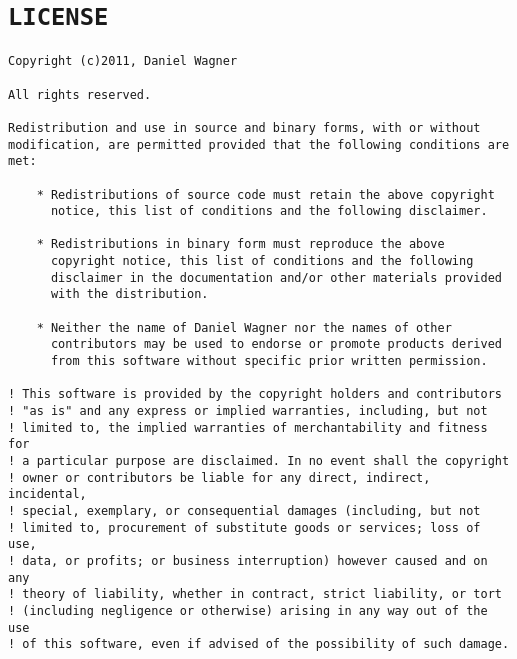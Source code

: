 \section{\texttt{LICENSE}}
\begin{verbatim}
Copyright (c)2011, Daniel Wagner

All rights reserved.

Redistribution and use in source and binary forms, with or without
modification, are permitted provided that the following conditions are met:

    * Redistributions of source code must retain the above copyright
      notice, this list of conditions and the following disclaimer.

    * Redistributions in binary form must reproduce the above
      copyright notice, this list of conditions and the following
      disclaimer in the documentation and/or other materials provided
      with the distribution.

    * Neither the name of Daniel Wagner nor the names of other
      contributors may be used to endorse or promote products derived
      from this software without specific prior written permission.

! This software is provided by the copyright holders and contributors
! "as is" and any express or implied warranties, including, but not
! limited to, the implied warranties of merchantability and fitness for
! a particular purpose are disclaimed. In no event shall the copyright
! owner or contributors be liable for any direct, indirect, incidental,
! special, exemplary, or consequential damages (including, but not
! limited to, procurement of substitute goods or services; loss of use,
! data, or profits; or business interruption) however caused and on any
! theory of liability, whether in contract, strict liability, or tort
! (including negligence or otherwise) arising in any way out of the use
! of this software, even if advised of the possibility of such damage.

\end{verbatim}

